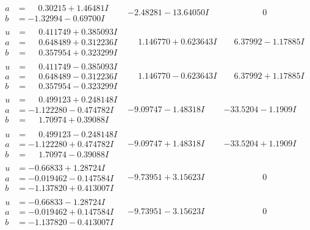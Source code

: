 \documentclass[1p]{elsarticle_modified}
\theoremstyle{definition}
\begin{document}
$$\begin{array}{c|c|c}
\begin{aligned}
a &= \phantom{-}0.30215 + 1.46481 I \\
b &= -1.32994 - 0.69700 I\end{aligned}
 & -2.48281 - 13.64050 I & \phantom{-0.000000 } 0 \\ \hline\begin{aligned}
u &= \phantom{-}0.411749 + 0.385093 I \\
a &= \phantom{-}0.648489 + 0.312236 I \\
b &= \phantom{-}0.357954 + 0.323299 I\end{aligned}
 & \phantom{-}1.146770 + 0.623643 I & \phantom{-}6.37992 - 1.17885 I \\ \hline\begin{aligned}
u &= \phantom{-}0.411749 - 0.385093 I \\
a &= \phantom{-}0.648489 - 0.312236 I \\
b &= \phantom{-}0.357954 - 0.323299 I\end{aligned}
 & \phantom{-}1.146770 - 0.623643 I & \phantom{-}6.37992 + 1.17885 I \\ \hline\begin{aligned}
u &= \phantom{-}0.499123 + 0.248148 I \\
a &= -1.122280 - 0.474782 I \\
b &= \phantom{-}1.70974 + 0.39088 I\end{aligned}
 & -9.09747 - 1.48318 I & -33.5204 - 1.1909 I \\ \hline\begin{aligned}
u &= \phantom{-}0.499123 - 0.248148 I \\
a &= -1.122280 + 0.474782 I \\
b &= \phantom{-}1.70974 - 0.39088 I\end{aligned}
 & -9.09747 + 1.48318 I & -33.5204 + 1.1909 I \\ \hline\begin{aligned}
u &= -0.66833 + 1.28724 I \\
a &= -0.019462 - 0.147584 I \\
b &= -1.137820 + 0.413007 I\end{aligned}
 & -9.73951 + 3.15623 I & \phantom{-0.000000 } 0 \\ \hline\begin{aligned}
u &= -0.66833 - 1.28724 I \\
a &= -0.019462 + 0.147584 I \\
b &= -1.137820 - 0.413007 I\end{aligned}
 & -9.73951 - 3.15623 I & \phantom{-0.000000 } 0 \\ \hline\begin{aligned}

\end{aligned}
\end{array}$$
\end{document}
